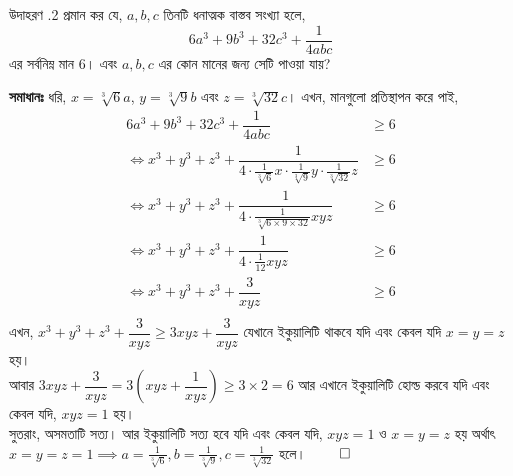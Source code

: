 \documentclass[12pt]{article}
\begin{document}
\begin{exam} {উদাহরণ \thesection.2}
    প্রমান কর যে, $a,b,c$ তিনটি ধনাত্মক বাস্তব সংখ্যা হলে, $$6a^3 + 9b^3 +32c^3 + \dfrac 1{4abc}$$
    এর সর্বনিম্ন মান $6$। এবং $a,b,c$ এর কোন মানের জন্য সেটি পাওয়া যায়? 
\end{exam}
\begin{sol}
    \textbf{সমাধানঃ} ধরি, $x = \sqrt[3]{6}a$, $y = \sqrt[3]{9}b$ এবং $z = \sqrt[3]{32}c$। এখন, মানগুলো 
    প্রতিস্থাপন করে পাই, \begin{align*}
        6a^3 + 9b^3 +32c^3 + \dfrac 1{4abc} &\geq 6\\
        \iff x^3 + y^3 + z^3 + \dfrac{1}{4\cdot \frac{1}{\sqrt[3]{6}}x\cdot \frac{1}{\sqrt[3]{9}}y\cdot \frac{1}{\sqrt[3]{32}}z} &\geq 6\\
        \iff x^3 + y^3 + z^3 + \dfrac{1}{4\cdot \frac{1}{\sqrt[3]{6\times 9\times 32}}xyz} &\geq 6\\
        \iff x^3 + y^3 + z^3 + \dfrac{1}{4\cdot \frac{1}{12}xyz} &\geq 6\\
        \iff x^3 + y^3 + z^3 + \dfrac{3}{xyz} &\geq 6\\
    \end{align*}
    এখন, $x^3 + y^3 + z^3 + \dfrac{3}{xyz} \geq 3xyz + \dfrac{3}{xyz}$ যেখানে ইকুয়ালিটি থাকবে যদি এবং কেবল যদি $x=y=z$ হয়।\\
    আবার $3xyz + \dfrac{3}{xyz} = 3\left(xyz + \dfrac1{xyz}\right) \geq 3\times 2 = 6$ আর এখানে ইকুয়ালিটি হোল্ড করবে যদি 
    এবং কেবল যদি, $xyz = 1$ হয়।\\ 
    সুতরাং, অসমতাটি সত্য। আর ইকুয়ালিটি সত্য হবে যদি এবং কেবল যদি, $xyz = 1$ ও $x=y=z$ হয় অর্থাৎ 
    $x=y=z=1 \implies a=\frac 1{\sqrt[3]{6}}, b=\frac 1{\sqrt[3]{9}}, c=\frac 1{\sqrt[3]{32}}$ হলে। $\qed$
\end{sol}
\end{document}
